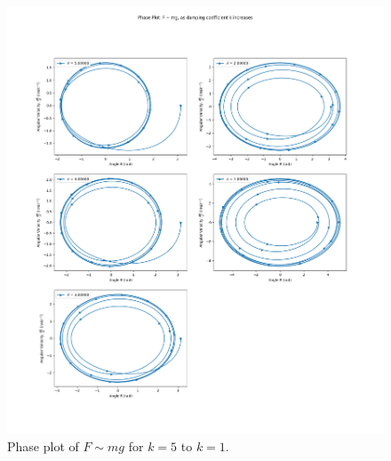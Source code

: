 \documentclass[10pt, twocolumn]{article}
\begin{document}
\begin{figure}[H]
    \centering
    \includegraphics[width = \columnwidth]{Projects/ForcedSimplePendulum/Plots/Phase plot of F~mg as damping coefficient k increases from 5 to 1.png}
    \caption{Phase plot of $F \sim{mg}$ for $k = 5$ to $k = 1$.}
    \label{fig:enter-label}
\end{figure}
\end{document}
